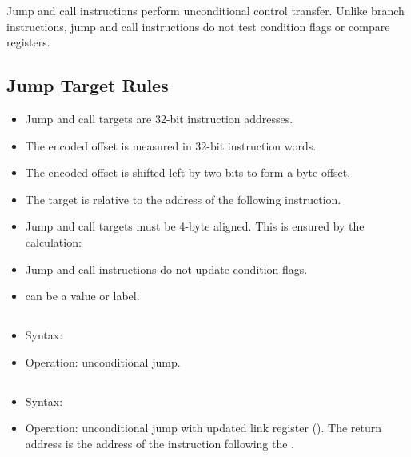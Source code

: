 Jump and call instructions perform unconditional control transfer. Unlike branch
instructions, jump and call instructions do not test condition flags or compare
registers.

\subsection{Jump Target Rules}

\begin{itemize}
\item Jump and call targets are 32-bit instruction addresses.
\item The encoded offset is measured in 32-bit instruction words.
\item The encoded offset is shifted left by two bits to form a byte offset.
\item The target is relative to the address of the following instruction.
\item Jump and call targets must be 4-byte aligned. This is ensured by the
      calculation:

\item Jump and call instructions do not update condition flags.
\item {} can be a value or label.
\end{itemize}

\subsection{}

\begin{itemize}
\item Syntax: 
\item Operation: unconditional jump.
\end{itemize}

\subsection{}

\begin{itemize}
\item Syntax: 
\item Operation: unconditional jump with updated link register 
      (). The return address is the address of the instruction
      following the .

\end{itemize}

